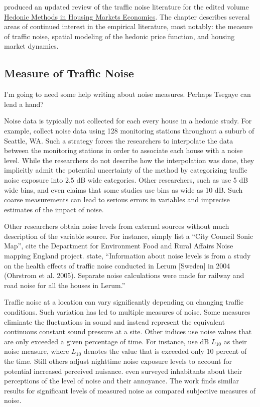 \documentclass{article}\usepackage{graphicx, color}
\begin{document}
\citet{Nelson2008} produced an updated review of the traffic noise literature for the edited volume \underline{Hedonic Methods in Housing Markets Economics}. The chapter describes several areas of continued interest in the empirical literature, most notably: the measure of traffic noise, spatial modeling of the hedonic price function, and housing market dynamics.

\subsection{Measure of Traffic Noise}
I'm going to need some help writing about noise measures. Perhaps Tsegaye can lend a hand?

Noise data is typically not collected for each every house in a hedonic study. For example, \citet{Huang;Palmquist2001} collect noise data using 128 monitoring stations throughout a suburb of Seattle, WA. Such a strategy forces the researchers to interpolate the data between the monitoring stations in order to associate each house with a noise level. While the researchers do not describe how the interpolation was done, they implicitly admit the potential uncertainty of the method by categorizing traffic noise exposure into 2.5 dB wide categories. Other researchers, such as \citet{Theebe2004a} use 5 dB wide bins, and \citet{Nelson2008} even claims that some studies use bins as wide as 10 dB. Such coarse measurements can lead to serious errors in variables and imprecise estimates of the impact of noise. 

Other researchers obtain noise levels from external sources without much description of the variable source. For instance, \cite{MarmolejoDuarteCarlos;GonzalezTamez2009} simply list a ``City Council Sonic Map'',  \citet{Blanco2011} cite the Department for Environment Food and Rural Affairs Noise mapping England project. \citet{Andersson2010} state, ``Information about noise levels is from a study on the health effects of traffic noise conducted in Lerum [Sweden] in 2004 (Ohrstrom et al. 2005). Separate noise calculations were made for railway and road noise for all the houses in Lerum.''

Traffic noise at a location can vary significantly depending on changing traffic conditions. Such variation has led to multiple measures of noise. Some measures eliminate the fluctuations in sound and instead represent the equivalent continuous constant sound pressure at a site. Other indices use noise values that are only exceeded a given percentage of time. For instance, \citet{Huang;Palmquist2001} use dB $L_{10}$ as their noise measure, where $L_{10}$ denotes the value that is exceeded only 10 percent of the time. Still others adjust nighttime noise exposure levels to account for potential increased perceived nuisance. \citet{Baranzini2010} even surveyed inhabitants about their perceptions of the level of noise and their annoyance. The work finds similar results for significant levels of measured noise as compared subjective measures of noise. 
\end{document}
